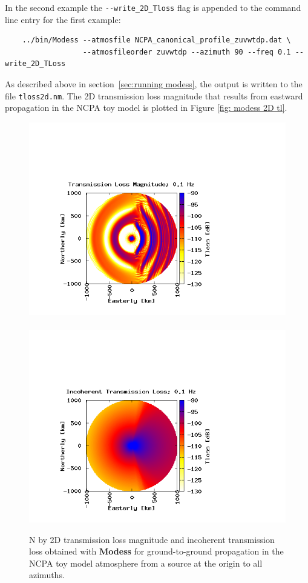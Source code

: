 In the second example the \verb+--write_2D_Tloss+ flag is appended to the command line entry for the first example: 
\begin{verbatim} 
    ../bin/Modess --atmosfile NCPA_canonical_profile_zuvwtdp.dat \ 
                  --atmosfileorder zuvwtdp --azimuth 90 --freq 0.1 --write_2D_TLoss
\end{verbatim}
As described above in section~\ref{sec:running modess}, the output is written to the file \verb+tloss2d.nm+. The 2D transmission loss magnitude that results from eastward propagation in the NCPA toy model is plotted in Figure \ref{fig: modess 2D tl}. 
\begin{figure}
\begin{center}
\includegraphics[scale=0.45,trim = 70 20 180 140,clip]{figs/modess_ex3}\ 
\includegraphics[scale=0.45,trim = 70 20 180 140,clip]{figs/modess_ex3_inco}
\end{center}
\caption{N by 2D transmission loss magnitude and incoherent transmission loss obtained with {\bf Modess} for ground-to-ground propagation in the NCPA toy model atmosphere from a source at the origin to all azimuths.}
\label{fig: modess Nby2D tl}
\end{figure}

